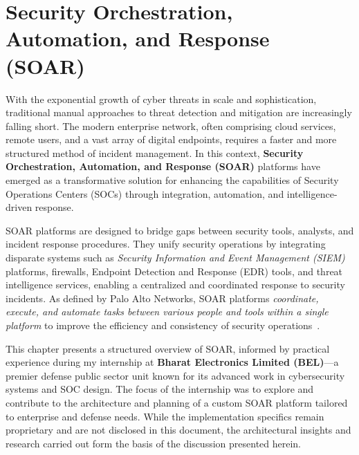 \chapter{Security Orchestration, Automation, and Response (SOAR)}

With the exponential growth of cyber threats in scale and sophistication, traditional manual approaches to threat detection and mitigation are increasingly falling short. The modern enterprise network, often comprising cloud services, remote users, and a vast array of digital endpoints, requires a faster and more structured method of incident management. In this context, \textbf{Security Orchestration, Automation, and Response (SOAR)} platforms have emerged as a transformative solution for enhancing the capabilities of Security Operations Centers (SOCs) through integration, automation, and intelligence-driven response.

SOAR platforms are designed to bridge gaps between security tools, analysts, and incident response procedures. They unify security operations by integrating disparate systems such as \textit{Security Information and Event Management (SIEM)} platforms, firewalls, Endpoint Detection and Response (EDR) tools, and threat intelligence services, enabling a centralized and coordinated response to security incidents. As defined by Palo Alto Networks, SOAR platforms \textit{coordinate, execute, and automate tasks between various people and tools within a single platform} to improve the efficiency and consistency of security operations~\cite{paloalto}.

This chapter presents a structured overview of SOAR, informed by practical experience during my internship at \textbf{Bharat Electronics Limited (BEL)}—a premier defense public sector unit known for its advanced work in cybersecurity systems and SOC design. The focus of the internship was to explore and contribute to the architecture and planning of a custom SOAR platform tailored to enterprise and defense needs. While the implementation specifics remain proprietary and are not disclosed in this document, the architectural insights and research carried out form the basis of the discussion presented herein.


